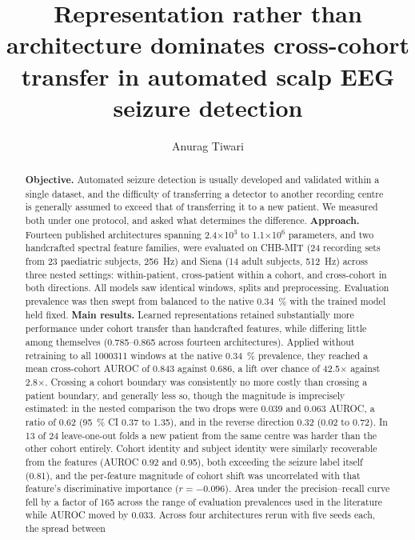 \documentclass[11pt,a4paper]{article}
\title{\vspace{-1.2cm}\bfseries Representation rather than architecture
dominates cross-cohort transfer in automated scalp EEG seizure detection}
\author[1]{Anurag Tiwari}
\affil[1]{\small Department of Computer Science and Engineering, South Asian
University, Maidan Garhi, New Delhi 110068, India\\
\texttt{anuragtiwari@sau.int}}
\date{}
\begin{document}
\maketitle
\vspace{-0.8cm}

\begin{abstract}
\noindent\small
\textbf{Objective.} Automated seizure detection is usually developed and
validated within a single dataset, and the difficulty of transferring a
detector to another recording centre is generally assumed to exceed that of
transferring it to a new patient. We measured both under one protocol, and
asked what determines the difference.
\textbf{Approach.} Fourteen published architectures spanning 2.4$\times$10$^3$
to 1.1$\times$10$^6$ parameters, and two handcrafted spectral feature
families, were evaluated on CHB-MIT (24 recording sets from 23 paediatric
subjects, \SI{256}{\hertz})
and Siena (14 adult subjects, \SI{512}{\hertz}) across three nested settings:
within-patient, cross-patient within a cohort, and cross-cohort in both
directions. All models saw identical windows, splits and preprocessing.
Evaluation prevalence was then swept from balanced to the native
\SI{0.34}{\percent} with the trained model held fixed.
\textbf{Main results.} Learned representations retained substantially more
performance under cohort transfer than handcrafted features, while differing
little among themselves (0.785--0.865 across fourteen architectures). Applied
without retraining to all \num{1000311} windows at the native
\SI{0.34}{\percent} prevalence, they reached a mean cross-cohort AUROC of
0.843 against 0.686, a lift over chance of 42.5$\times$ against
2.8$\times$. Crossing a cohort boundary was consistently no more
costly than crossing a patient boundary, and generally less so, though the
magnitude is imprecisely estimated: in the nested comparison the two drops
were 0.039 and 0.063 AUROC, a ratio of 0.62 (\SI{95}{\percent} CI 0.37 to
1.35), and in the reverse direction 0.32 (0.02 to 0.72). In 13 of 24
leave-one-out folds a new patient from the same centre was harder than the
other cohort entirely.
Cohort identity and subject identity were similarly recoverable from the
features (AUROC 0.92 and 0.95), both exceeding the seizure label itself
(0.81), and the per-feature magnitude of cohort shift was uncorrelated with
that feature's discriminative importance ($r=-0.096$). Area under the
precision--recall curve fell by a factor of 165 across the range of
evaluation prevalences used in the literature while AUROC moved by 0.033.
Across four architectures rerun with five seeds each, the spread between

\end{abstract}
\end{document}
